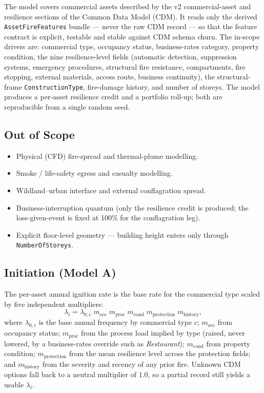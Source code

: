 \documentclass[11pt,a4paper]{article}
\begin{document}
The model covers commercial assets described by the v2 commercial-asset and
resilience sections of the Common Data Model (CDM). It reads only the derived
\texttt{AssetFireFeatures} bundle --- never the raw CDM record --- so that the
feature contract is explicit, testable and stable against CDM schema churn. The
in-scope drivers are: commercial type, occupancy status, business-rates
category, property condition, the nine resilience-level fields (automatic
detection, suppression systems, emergency procedures, structural fire
resistance, compartments, fire stopping, external materials, access route,
business continuity), the structural-frame \texttt{ConstructionType},
fire-damage history, and number of storeys. The model
produces a per-asset resilience credit and a portfolio roll-up; both are
reproducible from a single random seed.

\subsection{Out of Scope}

\begin{itemize}
  \item Physical (CFD) fire-spread and thermal-plume modelling.
  \item Smoke / life-safety egress and casualty modelling.
  \item Wildland--urban interface and external conflagration spread.
  \item Business-interruption quantum (only the resilience credit is produced;
        the loss-given-event is fixed at 100\% for the conflagration leg).
  \item Explicit floor-level geometry --- building height enters only through
        \texttt{NumberOfStoreys}.
\end{itemize}

\mkmframework

\subsection{Initiation (Model A)}

The per-asset annual ignition rate is the base rate for the commercial type
scaled by five independent multipliers:
\[
\lambda_i = \lambda_{0,c}\; m_{\text{occ}}\; m_{\text{proc}}\; m_{\text{cond}}\;
            m_{\text{protection}}\; m_{\text{history}},
\]
where $\lambda_{0,c}$ is the base annual frequency by commercial type $c$;
$m_{\text{occ}}$ from occupancy status; $m_{\text{proc}}$ from the process load
implied by type (raised, never lowered, by a business-rates override such as
\emph{Restaurant}); $m_{\text{cond}}$ from property condition;
$m_{\text{protection}}$ from the mean resilience level across the protection
fields; and $m_{\text{history}}$ from the severity and recency of any prior
fire. Unknown CDM options fall back to a neutral multiplier of $1.0$, so a
partial record still yields a usable $\lambda_i$.
\end{document}
